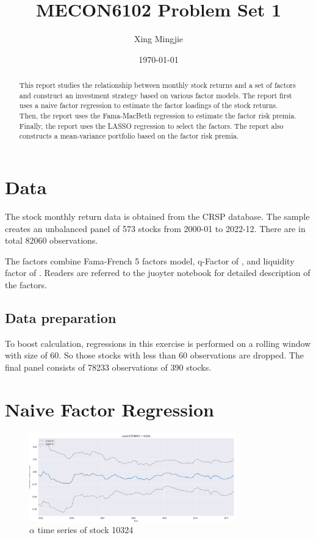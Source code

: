 \documentclass[10pt]{article} %
\title{MECON6102 Problem Set 1}
\author{Xing Mingjie}
\date{\today} %
\begin{document}
\maketitle


\begin{abstract}
    This report studies the relationship between monthly stock returns and a set of factors and construct an investment strategy based on various factor models. The report first uses a naive factor regression to estimate the factor loadings of the stock returns. Then, the report uses the Fama-MacBeth regression to estimate the factor risk premia. Finally, the report uses the LASSO regression to select the factors. The report also constructs a mean-variance portfolio based on the factor risk premia.
\end{abstract}

\section{Data}
The stock monthly return data is obtained from the CRSP database. The sample creates an unbalanced panel of 573 stocks from 2000-01 to 2022-12. There are in total 82060 observations.

The factors combine Fama-French 5 factors model, q-Factor of \cite{HouXueZhang2014}, and liquidity factor of \cite{PastorStambaugh2003}. Readers are referred to the juoyter notebook for detailed description of the factors.

\subsection{Data preparation}
    To boost calculation, regressions in this exercise is performed on a rolling window with size of 60. So those stocks with less than 60 observations are dropped. The final panel consists of 78233 observations of 390 stocks.
\section{Naive Factor Regression}

\begin{figure}
    \centering
    \includegraphics[width=0.8\textwidth]{"../fig/const_naive_coeff.png"}
    \caption{$\alpha$ time series of stock 10324}
    \label{fig:const_naive_coeff}
\end{figure}
\end{document}
